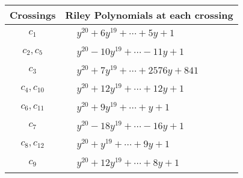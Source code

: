 \documentclass[1p]{elsarticle_modified}
\theoremstyle{definition}
\begin{document}
\begin{tabular}{m{50pt}|m{274pt}}
Crossings & \hspace{64pt}Riley Polynomials at each crossing \\
\hline $$\begin{aligned}c_{1}\end{aligned}$$&$\begin{aligned}
&y^{20}+6 y^{19}+\cdots+5 y+1
\end{aligned}$\\
\hline $$\begin{aligned}c_{2},c_{5}\end{aligned}$$&$\begin{aligned}
&y^{20}-10 y^{19}+\cdots-11 y+1
\end{aligned}$\\
\hline $$\begin{aligned}c_{3}\end{aligned}$$&$\begin{aligned}
&y^{20}+7 y^{19}+\cdots+2576 y+841
\end{aligned}$\\
\hline $$\begin{aligned}c_{4},c_{10}\end{aligned}$$&$\begin{aligned}
&y^{20}+12 y^{19}+\cdots+12 y+1
\end{aligned}$\\
\hline $$\begin{aligned}c_{6},c_{11}\end{aligned}$$&$\begin{aligned}
&y^{20}+9 y^{19}+\cdots+y+1
\end{aligned}$\\
\hline $$\begin{aligned}c_{7}\end{aligned}$$&$\begin{aligned}
&y^{20}-18 y^{19}+\cdots-16 y+1
\end{aligned}$\\
\hline $$\begin{aligned}c_{8},c_{12}\end{aligned}$$&$\begin{aligned}
&y^{20}+y^{19}+\cdots+9 y+1
\end{aligned}$\\
\hline $$\begin{aligned}c_{9}\end{aligned}$$&$\begin{aligned}
&y^{20}+12 y^{19}+\cdots+8 y+1
\end{aligned}$\\
\hline
\end{tabular}\\~\\
\end{document}
